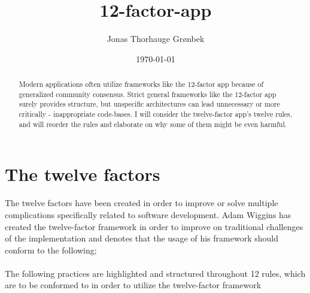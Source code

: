 \documentclass[a4paper,10pt]{article}
\title{12-factor-app}
\author{Jonas Thorhauge Grønbek}
\date{\today}
\begin{document}
	\maketitle
	\thispagestyle{empty}
	
	\begin{abstract}
		Modern applications often utilize frameworks like the 12-factor app because of generalized community consensus. Strict general frameworks like the 12-factor app surely provides structure, but unspecific architectures can lead unnecessary or more critically - inappropriate code-bases. I will consider the twelve-factor app's twelve rules, and will reorder the rules and elaborate on why some of them might be even harmful.  
	\end{abstract}

	\section{The twelve factors}
			The twelve factors have been created in order to improve or solve multiple complications specifically related to software development. Adam Wiggins has created the twelve-factor framework in order to improve on traditional challenges of the implementation and denotes that the usage of his framework should conform to the following;\\
	\cite[		Use declarative formats for setup automation, to minimize time and cost for new developers joining the project\\
	Have a clean contract with the underlying operating system, offering maximum portability between execution environments\\
	Are suitable for deployment on modern cloud platforms, obviating the need for servers and systems administration\\
	Minimize divergence between development and production, enabling continuous deployment for maximum agility\\
	And can scale up without significant changes to tooling, architecture, or development practices.
		]{documentation}\\
	The following practices are highlighted and structured throughout 12 rules, which are to be conformed to in order to utilize the twelve-factor framework\\
\end{document}
